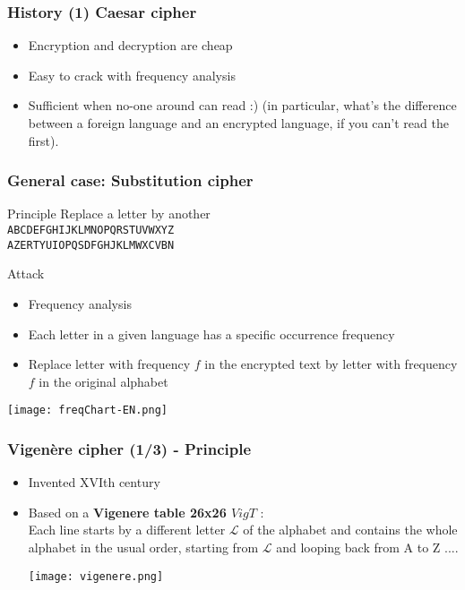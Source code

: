 \documentclass[
hyperref={pdfpagelabels=false}
,xcolor=table
]
{beamer}
\newcommand{\plus}{{\texttt{[image: plus.png]}}}
\newcommand{\minus}{{\texttt{[image: minus.png]}}}
\begin{document}
\begin{frame}
  \frametitle{History (1) Caesar cipher}
 
  \begin{itemize}
  \item[\plus] Encryption and decryption are cheap
  \item[\minus] Easy to crack with frequency analysis
  \item[\plus / \minus] Sufficient when no-one around can read :) (in
    particular, what's the difference between a foreign language and
    an encrypted language, if you can't read the first).
  \end{itemize}
\end{frame}


\begin{frame}[fragile]
  \frametitle{General case: Substitution cipher}

  \begin{block}{Principle}
    Replace a letter by another\\
    \verb+ABCDEFGHIJKLMNOPQRSTUVWXYZ+\\
    \verb+AZERTYUIOPQSDFGHJKLMWXCVBN+
  \end{block}
  \begin{block}{Attack}
    \begin{itemize}
    \item Frequency analysis
    \item Each letter in a given language has a specific occurrence frequency
    \item Replace letter with frequency $f$ in the encrypted text by
      letter with frequency $f$ in the original alphabet
  \end{itemize}
  \end{block}

  \begin{center}
    \texttt{[image: freqChart-EN.png]}
  \end{center}
  
\end{frame}


\begin{frame}
  \frametitle{Vigenère cipher (1/3) - Principle}
    \begin{itemize}
    \item Invented XVIth century
    \item Based on a \textbf{Vigenere table 26x26 $VigT$} : \\
      Each line starts by a different letter $\mathcal{L}$ of the
      alphabet and contains the whole alphabet in the usual order,
      starting from $\mathcal{L}$ and looping back from A to Z ....
      \begin{center}
        \texttt{[image: vigenere.png]}
      \end{center}
    \end{itemize}
\end{frame}
\end{document}
